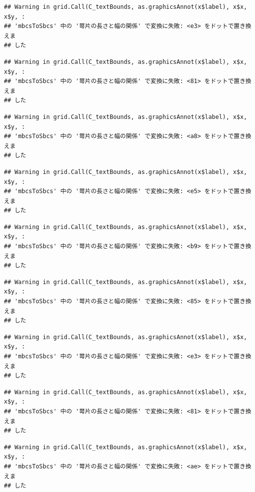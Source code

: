 \documentclass[
]{book}
\begin{document}
\begin{verbatim}
## Warning in grid.Call(C_textBounds, as.graphicsAnnot(x$label), x$x, x$y, :
## 'mbcsToSbcs' 中の '萼片の長さと幅の関係' で変換に失敗: <e3> をドットで置き換えま
## した
\end{verbatim}

\begin{verbatim}
## Warning in grid.Call(C_textBounds, as.graphicsAnnot(x$label), x$x, x$y, :
## 'mbcsToSbcs' 中の '萼片の長さと幅の関係' で変換に失敗: <81> をドットで置き換えま
## した
\end{verbatim}

\begin{verbatim}
## Warning in grid.Call(C_textBounds, as.graphicsAnnot(x$label), x$x, x$y, :
## 'mbcsToSbcs' 中の '萼片の長さと幅の関係' で変換に失敗: <a8> をドットで置き換えま
## した
\end{verbatim}

\begin{verbatim}
## Warning in grid.Call(C_textBounds, as.graphicsAnnot(x$label), x$x, x$y, :
## 'mbcsToSbcs' 中の '萼片の長さと幅の関係' で変換に失敗: <e5> をドットで置き換えま
## した
\end{verbatim}

\begin{verbatim}
## Warning in grid.Call(C_textBounds, as.graphicsAnnot(x$label), x$x, x$y, :
## 'mbcsToSbcs' 中の '萼片の長さと幅の関係' で変換に失敗: <b9> をドットで置き換えま
## した
\end{verbatim}

\begin{verbatim}
## Warning in grid.Call(C_textBounds, as.graphicsAnnot(x$label), x$x, x$y, :
## 'mbcsToSbcs' 中の '萼片の長さと幅の関係' で変換に失敗: <85> をドットで置き換えま
## した
\end{verbatim}

\begin{verbatim}
## Warning in grid.Call(C_textBounds, as.graphicsAnnot(x$label), x$x, x$y, :
## 'mbcsToSbcs' 中の '萼片の長さと幅の関係' で変換に失敗: <e3> をドットで置き換えま
## した
\end{verbatim}

\begin{verbatim}
## Warning in grid.Call(C_textBounds, as.graphicsAnnot(x$label), x$x, x$y, :
## 'mbcsToSbcs' 中の '萼片の長さと幅の関係' で変換に失敗: <81> をドットで置き換えま
## した
\end{verbatim}

\begin{verbatim}
## Warning in grid.Call(C_textBounds, as.graphicsAnnot(x$label), x$x, x$y, :
## 'mbcsToSbcs' 中の '萼片の長さと幅の関係' で変換に失敗: <ae> をドットで置き換えま
## した
\end{verbatim}
\end{document}
